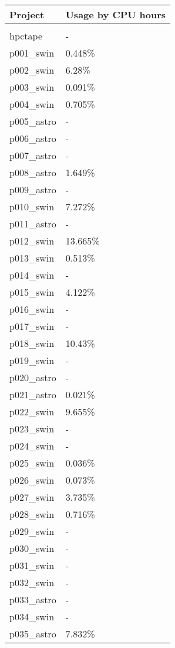 \documentclass{article}%
\begin{document}
%
\begin{longtabu}{X[l] X[r]}%
\textbf{Project}&\textbf{Usage by CPU hours}\\%
\hline%
&\\%
hpctape&{-}\\%
\hline%
p001\_swin&0.448\%\\%
\hline%
p002\_swin&6.28\%\\%
\hline%
p003\_swin&0.091\%\\%
\hline%
p004\_swin&0.705\%\\%
\hline%
p005\_astro&{-}\\%
\hline%
p006\_astro&{-}\\%
\hline%
p007\_astro&{-}\\%
\hline%
p008\_astro&1.649\%\\%
\hline%
p009\_astro&{-}\\%
\hline%
p010\_swin&7.272\%\\%
\hline%
p011\_astro&{-}\\%
\hline%
p012\_swin&13.665\%\\%
\hline%
p013\_swin&0.513\%\\%
\hline%
p014\_swin&{-}\\%
\hline%
p015\_swin&4.122\%\\%
\hline%
p016\_swin&{-}\\%
\hline%
p017\_swin&{-}\\%
\hline%
p018\_swin&10.43\%\\%
\hline%
p019\_swin&{-}\\%
\hline%
p020\_astro&{-}\\%
\hline%
p021\_astro&0.021\%\\%
\hline%
p022\_swin&9.655\%\\%
\hline%
p023\_swin&{-}\\%
\hline%
p024\_swin&{-}\\%
\hline%
p025\_swin&0.036\%\\%
\hline%
p026\_swin&0.073\%\\%
\hline%
p027\_swin&3.735\%\\%
\hline%
p028\_swin&0.716\%\\%
\hline%
p029\_swin&{-}\\%
\hline%
p030\_swin&{-}\\%
\hline%
p031\_swin&{-}\\%
\hline%
p032\_swin&{-}\\%
\hline%
p033\_astro&{-}\\%
\hline%
p034\_swin&{-}\\%
\hline%
p035\_astro&7.832\%\\%

\end{longtabu}
\end{document}

